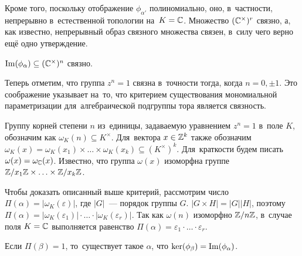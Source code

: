 Кроме того, поскольку отображение $\phi_{\alpha'}$ полиномиально, оно, в~частности, непрерывно в~естественной топологии на~$K = \mathbb{C}$.
Множество $(\mathbb{C}^\times)^r$ связно, а, как известно, непрерывный образ связного множества связен, в~силу чего верно ещё одно утверждение.

\begin{statement*}
  $\mathrm{Im}(\phi_\alpha) \subseteq (\mathbb{C}^\times)^n$ связно.
\end{statement*}

Теперь отметим, что группа $z^n = 1$ связна в~точности тогда, когда $n = 0, \pm 1$.
Это соображение указывает на~то, что критерием существования мономиальной параметризации
для~алгебраической подгруппы тора является связность.

Группу корней степени $n$ из~единицы, задаваемую уравнением $z^n = 1$ в~поле $K$, обозначим как $\omega_K(n) \subseteq K^\times$.
Для~вектора $x \in \mathbb{Z}^k$ также обозначим $\omega_K(x) = \omega_K(x_1) \times \ldots \times \omega_K(x_k) \subseteq (K^\times)^k$.
Для~краткости будем писать $\omega(x) = \omega_{\mathbb{C}}(x)$. Известно, что группа $\omega(x)$ изоморфна
группе $\mathbb{Z} / x_1 \mathbb{Z} \times \ldots \times \mathbb{Z} / x_k \mathbb{Z}$.

Чтобы доказать описанный выше критерий, рассмотрим число $\Pi(\alpha) = |\omega_K(\varepsilon)|$, где $|G|$~— порядок группы $G$.
$|G \times H| = |G| |H|$, поэтому $\Pi(\alpha) = |\omega_K(\varepsilon_1)| \cdot \ldots \cdot |\omega_K(\varepsilon_r)|$.
Так как $\omega(n)$ изоморфно $\mathbb{Z} / n \mathbb{Z}$, в~случае поля $K = \mathbb{C}$ выполняется
равенство $\Pi(\alpha) = \varepsilon_1 \cdot \ldots \cdot \varepsilon_r$.

\begin{lemma}
\label{lemma:exactOutOfPi}
  Если $\Pi(\beta) = 1$, то~существует такое $\alpha$, что $\ker(\phi_\beta) = \mathrm{Im}(\phi_\alpha)$.
\end{lemma}

